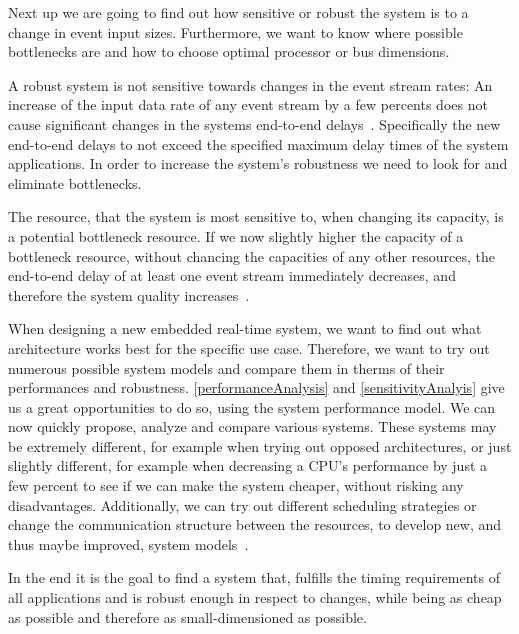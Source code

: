 \label{sensitivityAnalyis}

Next up we are going to find out how sensitive or robust the system is to a change in event input sizes.
Furthermore, we want to know where possible bottlenecks are and how to choose optimal processor or bus dimensions.


A robust system is not sensitive towards changes in the event stream rates:
An increase of the input data rate of any event stream by a few percents does not cause significant changes in the systems end-to-end delays~\cite{wan:06}.
Specifically the new end-to-end delays to not exceed the specified maximum delay times of the system applications.
In order to increase the system's robustness we need to look for and eliminate bottlenecks.


The resource, that the system is most sensitive to, when changing its capacity, is a potential bottleneck resource.
If we now slightly higher the capacity of a bottleneck resource,
without chancing the capacities of any other resources, the end-to-end delay of at least one event stream immediately decreases, and therefore the system quality increases~\cite{wan:06}.


When designing a new embedded real-time system, we want to find out what architecture works best for the specific use case.
Therefore, we want to try out numerous possible system models and compare them in therms of their performances and robustness.
\autoref{performanceAnalysis} and \autoref{sensitivityAnalyis} give us a great opportunities to do so, using the system performance model.
We can now quickly propose, analyze and compare various systems.
These systems may be extremely different, for example when trying out opposed architectures, or just slightly different, for example when decreasing a CPU's
performance by just a few percent to see if we can make the system cheaper, without risking any disadvantages.
Additionally, we can try out different scheduling strategies or change
the communication structure between the resources, to develop new, and thus maybe improved, system models~\cite{wan:06}.

In the end it is the goal to find a system that, fulfills the timing requirements of all applications
and is robust enough in respect to changes,
while being as cheap as possible and therefore as small-dimensioned as possible.

